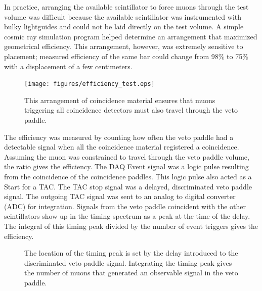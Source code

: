 In practice, arranging the available scintillator to force muons through the test volume was difficult because the available scintillator was instrumented with bulky lightguides and could not be laid directly on the test volume.  A simple cosmic ray simulation program helped determine an arrangement that maximized geometrical efficiency.  This arrangement, however, was extremely sensitive to placement; measured efficiency of the same bar could change from 98\% to 75\% with a displacement of a few centimeters.
\begin{figure}[htp]
\centering
\texttt{[image: figures/efficiency\_test.eps]}
\caption{This arrangement of coincidence material ensures that muons triggering all coincidence detectors must also travel through the veto paddle.}
\label{fig:efficiencyTest}
\end{figure}

The efficiency was measured by counting how often the veto paddle had a detectable signal when all the coincidence material registered a coincidence.  Assuming the muon was constrained to travel through the veto paddle volume, the ratio gives the efficiency.  The DAQ Event signal was a logic pulse resulting from the coincidence of the coincidence paddles.  This logic pulse also acted as a Start for a TAC.  The TAC stop signal was a delayed, discriminated veto paddle signal.  The outgoing TAC signal was sent to an analog to digital converter (ADC) for integration.  Signals from the veto paddle coincident with the other scintillators show up in the timing spectrum as a peak at the time of the delay.  The integral of this timing peak divided by the number of event triggers gives the efficiency.
\begin{figure}[htp]
\centering
{}
\caption{The location of the timing peak is set by the delay introduced to the discriminated veto paddle signal.  Integrating the timing peak gives the number of muons that generated an observable signal in the veto paddle.}
\label{fig:vetoTestElectronics}
\end{figure}

